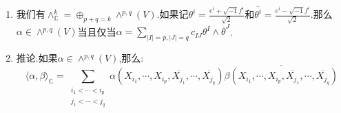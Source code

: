 \begin{enumerate}
\begin{proof}
		如果约定$f_1=e_{m+1},\cdots,f_m=e_{2m}$,结合$e_i=\frac{X_i+\overline{X_i}}{\sqrt{2}}$和$f_i=\frac{\sqrt{-1}(X_i-\overline{X_i})}{\sqrt{2}}$,那么有:
		\begin{align*}
			\langle\alpha,\beta\rangle_{\mathbb{C}}&=\langle\alpha,\overline{\beta}\rangle\\&=\frac{1}{k!}\sum_{1\le A_1,\cdots,A_k\le 2m}\alpha_{A_1,\cdots,A_k}\overline{\beta_{A_1,\cdots,A_k}}\\&=\frac{1}{k!}\sum_{1\le A_2,\cdots,A_k\le 2m}\sum_{i=1}^m\left(\alpha(e_i,e_{A_2},\cdots,e_{A_k})\overline{\beta(e_i,e_{A_2},\cdots,e_{A_k})}\right.\\&+\left.\alpha(f_i,e_{A_2},\cdots,e_{A_k})\overline{\beta(f_i,e_{A_2},\cdots,e_{A_k})}\right)\\&=\frac{1}{2k!}\sum_{1\le A_2,\cdots,A_k\le 2m}\sum_{i=1}^m\left(\alpha(X_i+\overline{X_i},e_{A_2},\cdots,e_{A_k})\overline{\beta(X_i+\overline{X_i},e_{A_2},\cdots,e_{A_k})}\right.\\&+\left.\alpha(X_i-\overline{X_i},e_{A_2},\cdots,e_{A_k})\overline{\beta(X_i-\overline{X_i},e_{A_2},\cdots,e_{A_k})}\right)\\&=\frac{1}{k!}\sum_{1\le A_2,\cdots,A_k\le 2m}\sum_{i=1}^m\left(\alpha(X_i,e_{A_2},\cdots,e_{A_k})\overline{\beta(X_i,e_{A_2},\cdots,e_{A_k})}\right.\\&+\left.\alpha(\overline{X_i},e_{A_2},\cdots,e_{A_k})\overline{\beta(\overline{X_i},e_{A_2},\cdots,e_{A_k})}\right)\\&=\cdots\\&=\frac{1}{k!}\sum_{i_1,\cdots,i_k\in\{1,\cdots,m,\overline{1},\cdots,\overline{m}\}}\alpha(X_{i_1},\cdots,X_{i_k})\overline{\beta(X_{i_1},\cdots,X_{i_k})}
		\end{align*}
	\end{proof}
    \item 我们有$\wedge_{\mathbb{C}}^k=\oplus_{p+q=k}\wedge^{p,q}(V)$.如果记$\theta^i=\frac{e^i+\sqrt{-1}f^i}{\sqrt{2}}$和$\overline{\theta^i}=\frac{e^i-\sqrt{-1}f^i}{\sqrt{2}}$.那么$\alpha\in\wedge^{p,q}(V)$当且仅当$\alpha=\sum_{|I|=p,|J|=q}c_{IJ}\theta^I\wedge\overline{\theta}^J$.
    \item 推论.如果$\alpha\in\wedge^{p,q}(V)$,那么:
    $$\langle\alpha,\beta\rangle_{\mathbb{C}}=\sum_{\substack{i_1<\cdots<i_p\\j_1<\cdots<j_q}}\alpha(X_{i_1},\cdots,X_{i_p},\overline{X_{j_1}},\cdots,\overline{X_{j_q}})\overline{\beta(X_{i_1},\cdots,X_{i_p},\overline{X_{j_1}},\cdots,\overline{X_{j_q}})}$$



\end{enumerate}

